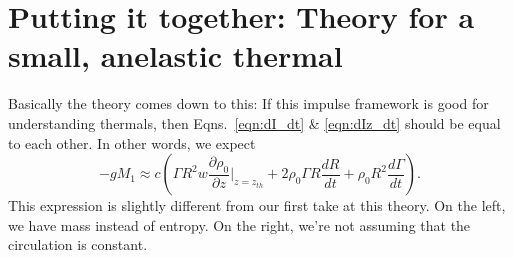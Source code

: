 \documentclass[onecolumn, amsmath, amsfonts, amssymb]{aastex62}
\begin{document}
\section{Putting it together: Theory for a small, anelastic thermal}
Basically the theory comes down to this: If this impulse framework is good for understanding
thermals, then Eqns.~\ref{eqn:dI_dt} \& \ref{eqn:dIz_dt} should be equal to each other.
In other words, we expect
\begin{equation}
-g M_1 \approx c\left(\Gamma R^2 w \frac{\partial \rho_0}{\partial z}\bigg|_{z=z_{th}}
+ 2 \rho_0 \Gamma R \frac{dR}{dt} + \rho_0 R^2 \frac{d\Gamma}{dt}\right).
\end{equation}
This expression is slightly different from our first take at this theory. On the left,
we have mass instead of entropy. On the right, we're not assuming that the circulation
is constant.


\end{document}
